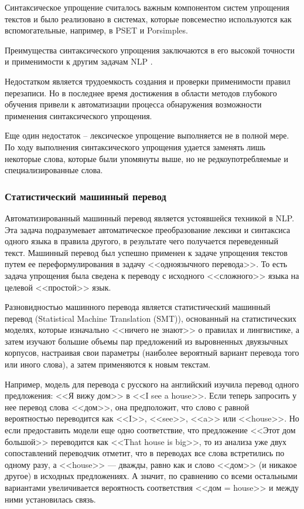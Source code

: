 Синтаксическое упрощение считалось важным компонентом систем упрощения текстов и было реализовано в системах, которые повсеместно используются как вспомогательные, например, в PSET\cite{alva} и Porsimples\cite{aluisio_fostering_2010}.

Преимущества синтаксического упрощения заключаются в его высокой точности и применимости к другим задачам NLP \cite{shardlow_survey_2014}. 

Недостатком является трудоемкость создания и проверки применимости правил перезаписи. Но в последнее время достижения в области методов глубокого обучения привели к автоматизации процесса обнаружения возможности применения синтаксического упрощения.

Еще один недостаток -- лексическое упрощение выполняется не в полной мере. По ходу выполнения синтаксического упрощения удается заменять лишь некоторые слова, которые были упомянуты выше, но не редкоупотребляемые и специализированные слова.


\subsubsection{Статистический машинный перевод}
Автоматизированный машинный перевод является устоявшейся техникой в NLP. Эта задача подразумевает автоматическое преобразование лексики и синтаксиса одного языка в правила другого, в результате чего получается переведенный текст. Машинный перевод был успешно применен\cite{shardlow_survey_2014} к задаче упрощения текстов путем ее переформулирования в задачу <<одноязычного перевода>>. То есть задача упрощения была сведена к переводу с исходного <<сложного>> языка на целевой <<простой>> язык.

Разновидностью машинного перевода является статистический машинный перевод (Statistical Machine Translation (SMT)), основанный на статистических моделях, которые изначально <<ничего не знают>> о правилах и лингвистике, а затем изучают большие объемы пар предложений из выровненных двуязычных корпусов, настраивая свои параметры (наиболее вероятный вариант перевода того или иного слова), а затем применяются к новым текстам. 

Например, модель для перевода с русского на английский изучила перевод одного предложения: <<Я вижу дом>> в <<I see a house>>. Если теперь запросить у нее перевод слова <<дом>>, она предположит, что слово с равной вероятностью переводится как <<I>>, <<see>>, <<a>> или <<house>>. Но если предоставить модели еще одно соответствие, что предложение <<Этот дом большой>> переводится как <<That house is big>>, то из анализа уже двух сопоставлений переводчик отметит, что в переводах все слова встретились по одному разу, а <<house>> — дважды, равно как и слово <<дом>> (и никакое другое) в исходных предложениях. А значит, по сравнению со всеми остальными вариантами увеличивается вероятность соответствия <<дом = house>> и между ними установилась связь. 

